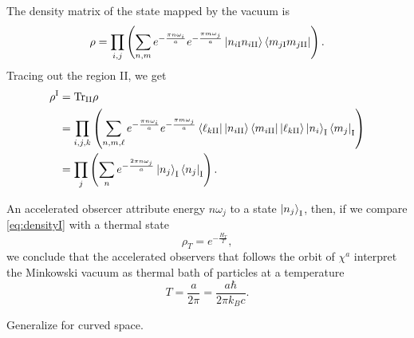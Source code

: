 The density matrix of the state mapped by the vacuum is
\begin{equation}
    \rho=\prod_{i,j}\left(\sum_{n,m}e^{-\frac{\pi n\omega_i}{a}}e^{-\frac{\pi m\omega_j}{a}}\ket{n_{i\text{I}}n_{i\text{II}}}\bra{m_{j\text{I}}m_{j\text{II}}}\right).
\end{equation}
Tracing out the region II, we get
\begin{subequations}\label{eq:densityI}
    \begin{align}
        \rho^{\text{I}}&=\text{Tr}_{\text{II}}\rho\\
        &=\prod_{i,j,k}\left(\sum_{n,m,\ell}e^{-\frac{\pi n\omega_i}{a}}e^{-\frac{\pi m\omega_j}{a}}\bra{\ell_{k\text{II}}}\ket{n_{i\text{II}}}\bra{m_{i\text{II}}}\ket{\ell_{k\text{II}}}\ket{n_i}_\text{I}\bra{m_j}_{\text{I}}\right)\\
        &=\prod_j\left(\sum_n e^{-\frac{2\pi n\omega_j}{a}}\ket{n_j}_\text{I}\bra{n_j}_{\text{I}}\right).
    \end{align}
\end{subequations}

An accelerated obsercer attribute energy \(n\omega_j\) to a state \(\ket{n_j}_\text{I}\), then, if we compare \cref{eq:densityI} with a thermal state
\begin{equation}
    \rho_T=e^{-\frac{H_T}{T}},
\end{equation}
we conclude that the accelerated observers that follows the orbit of \(\chi^a\) interpret the Minkowski vacuum as thermal bath of particles at a temperature
\begin{equation}
    T=\frac{a}{2\pi}=\frac{a\hbar}{2\pi k_Bc}.
\end{equation}

\begin{remark}
    Generalize for curved space.
\end{remark}